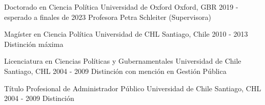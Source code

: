 





\begin{cventries}

\vspace{0.5mm}
\cventry
{Doctorado en Ciencia Política} 
{Universidad de Oxford} 
{Oxford, GBR} 
{2019 - esperado a finales de 2023} 
{Profesora Petra Schleiter (Supervisora)} \vspace{1.5mm}

\cventry
{Magíster en Ciencia Política} 
{Universidad de CHL} 
{Santiago, Chile} 
{2010 - 2013} 
{Distinción máxima} \vspace{1.5mm}

\cventry
{Licenciatura en Ciencias Políticas y Gubernamentales} 
{Universidad de Chile} 
{Santiago, CHL} 
{2004 - 2009} 
{Distinción con mención en Gestión Pública} \vspace{1.5mm}

\cventry
{Título Profesional de Administrador Público} 
{Universidad de Chile} 
{Santiago, CHL} 
{2004 - 2009} 
{Distinción}\vspace{1.5mm}

\end{cventries}
